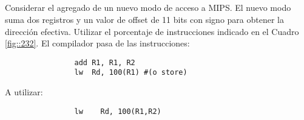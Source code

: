 \subsection{}
        
            Considerar el agregado de un nuevo modo de acceso a MIPS.
            El nuevo modo suma dos registros y un valor de offset de 11 bits con signo para obtener
            la dirección efectiva. Utilizar el porcentaje de instrucciones indicado en el Cuadro \ref{fig::232}.
            \vspace{3mm}
            El compilador pasa de las instrucciones: 
            \begin{verbatim}
                add R1, R1, R2
                lw  Rd, 100(R1) #(o store)
            \end{verbatim}
            \vspace{1.5mm}
            A utilizar:
            \begin{verbatim}
                lw    Rd, 100(R1,R2)
            \end{verbatim}
            
